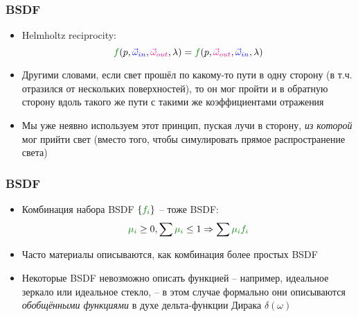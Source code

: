\documentclass[10pt]{beamer}
\begin{document}
\begin{frame}[fragile]
\frametitle{BSDF}
\begin{itemize}
\item Helmholtz reciprocity:
\begin{equation*}
{\color{green}f}(p, {\color{blue}\vec\omega_{in}}, {\color{magenta}\vec\omega_{out}}, \lambda) = {\color{green}f}(p, {\color{magenta}\vec\omega_{out}}, {\color{blue}\vec\omega_{in}}, \lambda)
\end{equation*}
\pause
\item Другими словами, если свет прошёл по какому-то пути в одну сторону (в т.ч. отразился от нескольких поверхностей), то он мог пройти и в обратную сторону вдоль такого же пути с такими же коэффициентами отражения
\pause
\item Мы уже неявно используем этот принцип, пуская лучи в сторону, \textit{из которой} мог прийти свет (вместо того, чтобы симулировать прямое распространение света)
\end{itemize}
\end{frame}

\begin{frame}[fragile]
\frametitle{BSDF}
\begin{itemize}
\item Комбинация набора BSDF \begin{math}\{{\color{green}f_i}\}\end{math} -- тоже BSDF:
\begin{equation*}
{\color{green}\mu_i} \geq 0, \sum {\color{green}\mu_i} \leq 1 \Rightarrow \sum {\color{green}\mu_i f_i}
\end{equation*}
\pause
\item Часто материалы описываются, как комбинация более простых BSDF
\pause
\item Некоторые BSDF невозможно описать функцией -- например, идеальное зеркало или идеальное стекло, -- в этом случае формально они описываются \textit{обобщёнными функциями} в духе дельта-функции Дирака \begin{math}\delta(\omega)\end{math}
\end{itemize}
\end{frame}
\end{document}
